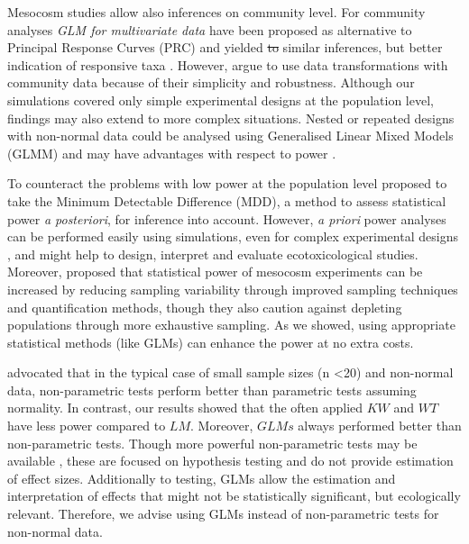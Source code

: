 \documentclass[twocolumn, natbib]{svjour3}
\providecommand{\DIFdel}[1]{{\protect\color{red}\sout{#1}}}                      %
\providecommand{\DIFdelbegin}{} %
\providecommand{\DIFdelend}{} %
\begin{document}
Mesocosm studies allow also inferences on community level. 
For community analyses \emph{GLM for multivariate data} \citep{warton_distance-based_2012} have been proposed as alternative to Principal Response Curves (PRC) and yielded \DIFdelbegin \DIFdel{to }\DIFdelend similar inferences, but better indication of responsive taxa \citep{szocs_analysing_2015}. 
However, \citet{ter_braak_topics_2014} argue to use data transformations with community data because of their simplicity and robustness.
Although our simulations covered only simple experimental designs at the population level, findings may also extend to more complex situations. 
Nested or repeated designs with non-normal data could be analysed using Generalised Linear Mixed Models (GLMM) and may have advantages with respect to power \citep{stroup_rethinking_2014}.

To counteract the problems with low power at the population level \citet{brock_minimum_2015} proposed to take the Minimum Detectable Difference (MDD), a method to assess statistical power \emph{a posteriori}, for inference into account.
However, \emph{a priori} power analyses can be performed easily using simulations, even for complex experimental designs \citep{johnson_power_2014}, and might help to design, interpret and evaluate ecotoxicological studies.
Moreover, \citet{brock_minimum_2015} proposed that statistical power of mesocosm experiments can be increased by reducing sampling variability through improved sampling techniques and quantification methods, though they also caution against depleting populations through more exhaustive sampling.
As we showed, using appropriate statistical methods (like GLMs) can enhance the power at no extra costs.

\citet{wang_making_2011} advocated that in the typical case of small sample sizes (n \textless 20) and non-normal data, non-parametric tests perform better than parametric tests assuming normality.
In contrast, our results showed that the often applied $KW$ and $WT$ have less power compared to $LM$.
Moreover, $GLMs$ always performed better than non-parametric tests. 
Though more powerful non-parametric tests may be available \citep{konietschke_rank-based_2012}, these are focused on hypothesis testing and do not provide estimation of effect sizes.
Additionally to testing, GLMs allow the estimation and interpretation of effects that might not be statistically significant, but ecologically relevant.
Therefore, we advise using GLMs instead of non-parametric tests for non-normal data.
\end{document}
